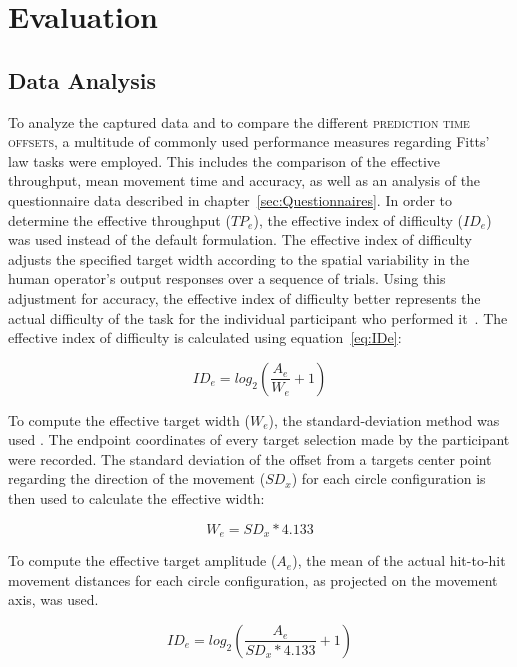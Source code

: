 \documentclass[sigconf]{acmart}
\begin{document}
\section{Evaluation}\label{tit:Evaluation}

\subsection{Data Analysis}

To analyze the captured data and to compare the different \textsc{prediction time offsets}, a multitude of commonly used performance measures regarding Fitts' law tasks were employed.
This includes the comparison of the effective throughput, mean movement  time and accuracy, as well as an analysis of the questionnaire data described in chapter~\ref{sec:Questionnaires}. 
In order to determine the effective throughput ($TP_e$), the effective index of difficulty ($ID_e$) was used instead of the default formulation.
The effective index of difficulty adjusts the specified target width according to the spatial variability in the human operator's output responses over a sequence of trials. 
Using this adjustment for accuracy, the effective index of difficulty better represents the actual difficulty of the task for the individual participant who performed it~\cite{Law2018}.
The effective index of difficulty is calculated using equation~\ref{eq:IDe}:

\begin{equation}
\label{eq:IDe}
  ID_e = log_2(\frac{A_e}{W_e}+1)
 \end{equation}

To compute the effective target width ($W_e$), the standard-deviation method was used \cite{Law2018}. The endpoint coordinates of every target selection made by the participant were recorded.
The standard deviation of the offset from a targets center point regarding the direction of the movement ($SD_x$) for each circle configuration is then used to calculate the effective width:

\begin{equation}
\label{eq:We}
  W_e = SD_x * 4.133
\end{equation}

 To compute the effective target amplitude ($A_e$), the mean of the actual hit-to-hit movement distances for each circle configuration, as projected on the movement axis, was used. 
 
 \begin{equation}
 \label{eq:IDe_long}
  	ID_e = log_2(\frac{A_e}{SD_x * 4.133} +1)
 \end{equation}
 
\end{document}
